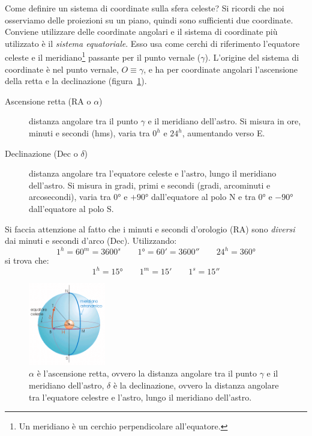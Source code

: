 Come definire un sistema di coordinate sulla sfera celeste? Si ricordi che noi osserviamo delle proiezioni su un piano, quindi sono sufficienti due coordinate. Conviene utilizzare delle coordinate angolari e il sistema di coordinate più utilizzato è il \emph{sistema equatoriale}. Esso usa come cerchi di riferimento l'equatore celeste e il meridiano\footnote{Un meridiano è un cerchio perpendicolare all'equatore.} passante per il punto vernale ($\gamma$). L'origine del sistema di coordinate è nel punto vernale, $O \equiv \gamma$, e ha per coordinate angolari l'ascensione della retta e la declinazione (figura~\ref{fig:sistema-equatoriale}).
\begin{description}
    \item[Ascensione retta (RA o $\alpha$)] distanza angolare tra il punto $\gamma$ e il meridiano dell'astro. Si misura in ore, minuti e secondi (hms), varia tra $0^h$ e $24^h$, aumentando verso E.
    \item[Declinazione (Dec o $\delta$)] distanza angolare tra l'equatore celeste e l'astro, lungo il meridiano dell'astro. Si misura in gradi, primi e secondi (gradi, arcominuti e arcosecondi), varia tra $\ang{0}$ e $+\ang{90}$ dall'equatore al polo N e tra $\ang{0}$ e $-\ang{90}$ dall'equatore al polo S.
\end{description}
Si faccia attenzione al fatto che i minuti e secondi d'orologio (RA) sono \emph{diversi} dai minuti e secondi d'arco (Dec). Utilizzando:
\[
    1^h = 60^m = 3600^s \qquad \ang{1} = 60' = 3600'' \qquad 24^h = \ang{360}
\]
si trova che:
\[
    1^h = \ang{15} \qquad 1^m = 15' \qquad 1^s = 15''
\]

\begin{figure}
\centering
\includegraphics[width=0.3\textwidth]{immagini/sistema-equatoriale.png}
\caption{$\alpha$ è l'ascensione retta, ovvero la distanza angolare tra il punto $\gamma$ e il meridiano dell'astro, $\delta$ è la declinazione, ovvero la distanza angolare tra l'equatore celestre e l'astro, lungo il meridiano dell'astro.}
\label{fig:sistema-equatoriale}
\end{figure}

